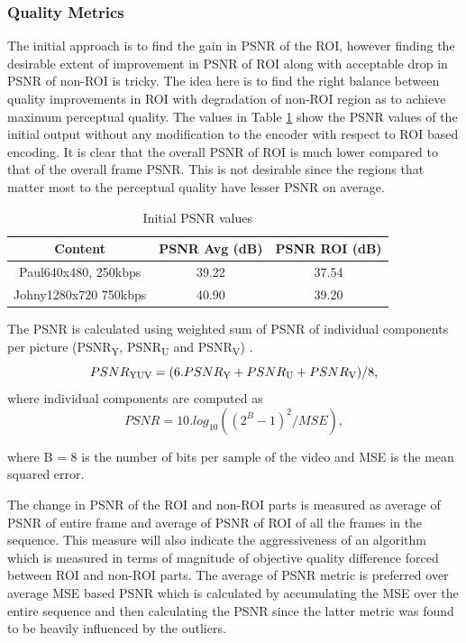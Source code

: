 \documentclass[11pt]{article} %
\begin{document}
\subsubsection{Quality Metrics}
The initial approach is to find the gain in PSNR of the ROI, however finding the desirable extent of improvement in PSNR of ROI along with acceptable drop in PSNR of non-ROI is tricky. The idea here is to find the right balance between quality improvements in ROI with degradation of non-ROI region as to achieve maximum perceptual quality. The values in Table \ref{InitPSNR1} show the PSNR values of the initial output without any modification to the encoder with respect to ROI based encoding. It is clear that the overall PSNR of ROI is much lower compared to that of the overall frame PSNR. This is not desirable since the regions that matter most to the perceptual quality have lesser PSNR on average.

\begin{table} [h!]
\centering
\begin{tabular}{ |c|c|c| }
 \hline
Content & PSNR Avg (dB) & PSNR ROI (dB) \\
 \hline 
 Paul640x480, 250kbps & 39.22 & 37.54 \\ 
 Johny1280x720 750kbps & 40.90 & 39.20 \\  
 \hline
\end{tabular}
 \caption{Initial PSNR values}
 \label{InitPSNR1}
\end{table}

The PSNR is calculated using weighted sum of PSNR of individual components per picture (PSNR\textsubscript{Y}, PSNR\textsubscript{U} and PSNR\textsubscript{V}) \cite{ComparingCodingEfficiency}.
\begin{equation}
\label{Eq:PSNR}
PSNR\textsubscript{YUV} = ( 6 . PSNR\textsubscript{Y} + PSNR\textsubscript{U} + PSNR\textsubscript{V}) / 8,
\end{equation}
 where individual components are computed as
\begin{equation}
\label{Eq:PSNRDef}
PSNR = 10 . log_{10}((2^B - 1)^2 / MSE),
\end{equation}

where B = 8 is the number of bits per sample of the video and MSE is the mean squared error.

The change in PSNR of the ROI and non-ROI parts is measured as average of PSNR of entire frame and average of PSNR of ROI of all the frames in the sequence. This measure will also indicate the aggressiveness of an algorithm which is measured in terms of magnitude of objective quality difference forced between ROI and non-ROI parts. The average of PSNR metric is preferred over average MSE based PSNR which is calculated by accumulating the MSE over the entire sequence and then calculating the PSNR since the latter metric was found to be heavily influenced by the outliers.
\end{document}
